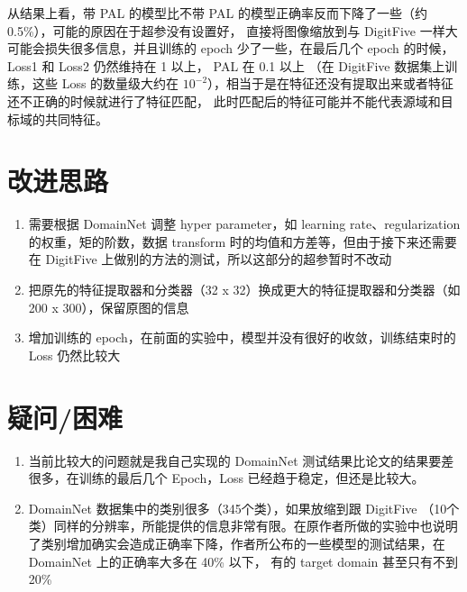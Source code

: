 \documentclass[UTF8]{ctexart}
\begin{document}
                从结果上看，带 PAL 的模型比不带 PAL 的模型正确率反而下降了一些（约0.5\%），可能的原因在于超参没有设置好，
                直接将图像缩放到与 DigitFive 一样大可能会损失很多信息，并且训练的 epoch 少了一些，在最后几个 epoch 的时候，Loss1 和 Loss2 仍然维持在 1 以上，
                PAL 在 0.1 以上 （在 DigitFive 数据集上训练，这些 Loss 的数量级大约在 $10^{-2}$），相当于是在特征还没有提取出来或者特征还不正确的时候就进行了特征匹配，
                此时匹配后的特征可能并不能代表源域和目标域的共同特征。
    \section{改进思路}
        \begin{enumerate}
            \item 需要根据 DomainNet 调整 hyper parameter，如 learning rate、regularization 的权重，矩的阶数，数据 transform 时的均值和方差等，但由于接下来还需要在 DigitFive 上做别的方法的测试，所以这部分的超参暂时不改动
            \item 把原先的特征提取器和分类器（32 x 32）换成更大的特征提取器和分类器（如 200 x 300），保留原图的信息
            \item 增加训练的 epoch，在前面的实验中，模型并没有很好的收敛，训练结束时的 Loss 仍然比较大
        \end{enumerate}
    \section{疑问/困难}
        \begin{enumerate}
            \item 当前比较大的问题就是我自己实现的 DomainNet 测试结果比论文的结果要差很多，在训练的最后几个 Epoch，Loss 已经趋于稳定，但还是比较大。
            \item DomainNet 数据集中的类别很多（345个类），如果放缩到跟 DigitFive （10个类）同样的分辨率，所能提供的信息非常有限。在原作者所做的实验中也说明了类别增加确实会造成正确率下降，作者所公布的一些模型的测试结果，在 DomainNet 上的正确率大多在 40\% 以下，
                有的 target domain 甚至只有不到 20\%
        \end{enumerate}
\end{document}
